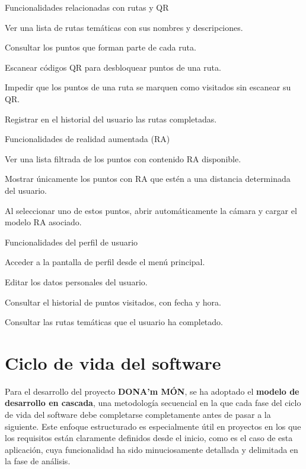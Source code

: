 \textsf{\large Funcionalidades relacionadas con rutas y QR}

\item[F33.] Ver una lista de rutas temáticas con sus nombres y descripciones.
\item[F34.] Consultar los puntos que forman parte de cada ruta.
\item[F35.] Escanear códigos QR para desbloquear puntos de una ruta.
\item[F36.] Impedir que los puntos de una ruta se marquen como visitados sin escanear su QR.
\item[F37.] Registrar en el historial del usuario las rutas completadas.

\textsf{\large Funcionalidades de realidad aumentada (RA)}

\item[F38.] Ver una lista filtrada de los puntos con contenido RA disponible.
\item[F39.] Mostrar únicamente los puntos con RA que estén a una distancia determinada del usuario.
\item[F40.] Al seleccionar uno de estos puntos, abrir automáticamente la cámara y cargar el modelo RA asociado.

\textsf{\large Funcionalidades del perfil de usuario}

\item[F41.] Acceder a la pantalla de perfil desde el menú principal.
\item[F42.] Editar los datos personales del usuario.
\item[F43.] Consultar el historial de puntos visitados, con fecha y hora.
\item[F44.] Consultar las rutas temáticas que el usuario ha completado.


\section{Ciclo de vida del software}

Para el desarrollo del proyecto \textbf{DONA'm MÓN}, se ha adoptado el \textbf{modelo de desarrollo en cascada}, una metodología secuencial en la que cada fase del ciclo de vida del software debe completarse completamente antes de pasar a la siguiente. Este enfoque estructurado es especialmente útil en proyectos en los que los requisitos están claramente definidos desde el inicio, como es el caso de esta aplicación, cuya funcionalidad ha sido minuciosamente detallada y delimitada en la fase de análisis.

